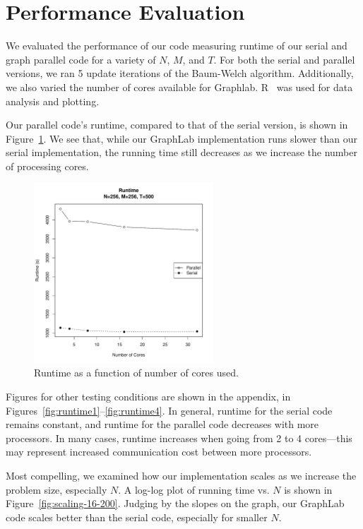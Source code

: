 \section{Performance Evaluation}

We evaluated the performance of our code measuring runtime of our serial and
graph parallel code for a variety of $N$, $M$, and $T$. For both the serial and
parallel versions, we ran 5 update iterations of the Baum-Welch algorithm.
Additionally, we also varied the number of cores available for Graphlab.
R~\cite{r} was used for data analysis and plotting. 

Our parallel code's runtime, compared to that of the serial version, is shown in
Figure~\ref{fig:runtime-256-500}. We see that, while our GraphLab implementation
runs slower than our serial implementation, the running time still decreases as
we increase the number of processing cores. 

\begin{figure}[htb]
    \centering
    \includegraphics[width=0.6\textwidth]{../figure/runtime-N_256-T_500.pdf}
    \caption{Runtime as a function of number of cores used.}
    \label{fig:runtime-256-500}
\end{figure}

Figures for other testing conditions are shown in the appendix, in
Figures~\ref{fig:runtime1}--\ref{fig:runtime4}. In general, runtime for the
serial code remains constant, and runtime for the parallel code decreases with
more processors. In many cases, runtime increases when going from 2 to 4
cores---this may represent increased communication cost between more processors. 

Most compelling, we examined how our implementation scales as we increase the
problem size, especially $N$. A log-log plot of running time vs. $N$ is shown in
Figure~\ref{fig:scaling-16-200}. Judging by the slopes on the graph, our
GraphLab code scales better than the serial code, especially for smaller $N$. 

